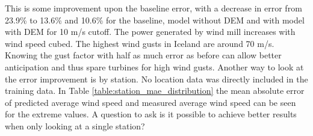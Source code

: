 
This is some improvement upon the baseline error, with a decrease in error from 23.9\% to 13.6\% and 10.6\% for the baseline, model without DEM and with model with DEM for 10 m/s cutoff. The power generated by wind mill increases with wind speed cubed\cite{wind_power}. The highest wind gusts in Iceland are around 70 m/s. Knowing the gust factor with half as much error as before can allow better anticipation and thus spare turbines for high wind gusts. Another way to look at the error improvement is by station. No location data was directly included in the training data. In Table \ref{table:station_mae_distribution} the mean absolute error of predicted average wind speed and measured average wind speed can be seen for the extreme values. A question to ask is it possible to achieve better results when only looking at a single station?


